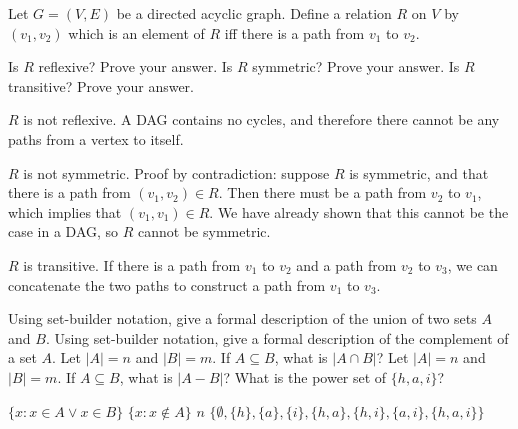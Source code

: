 \documentclass[solution, letterpaper]{cs20exam}
\begin{document}
\problem{}{}
Let $G = (V, E)$ be a directed acyclic graph. Define a relation $R$ on $V$ by $(v_1, v_2)$ which is an element of $R$ iff there is a path from $v_1$ to $v_2$.

\subproblem Is $R$ reflexive? Prove your answer.
\subproblem Is $R$ symmetric? Prove your answer.
\subproblem Is $R$ transitive? Prove your answer.

\begin{solution}

\subsolution $R$ is not reflexive. A DAG contains no cycles, and therefore there cannot be any paths from a vertex to itself.

\subsolution $R$ is not symmetric. Proof by contradiction: suppose $R$ is symmetric, and that there is a path from $(v_1, v_2) \in R$. Then there must be a path from $v_2$ to $v_1$, which implies that $(v_1, v_1) \in R$. We have already shown that this cannot be the case in a DAG, so $R$ cannot be symmetric.

\subsolution $R$ is transitive. If there is a path from $v_1$ to $v_2$ and a path from $v_2$ to $v_3$, we can concatenate the two paths to construct a path from $v_1$ to $v_3$.

\end{solution}


\pagebreak


\problem{}{}

\subproblem Using set-builder notation, give a formal description of the union of two sets $A$ and $B$. %
\subproblem Using set-builder notation, give a formal description of the complement of a set $A$. %
\subproblem Let $|A| = n$ and $|B| = m$. If $A \subseteq B$, what is $|A \cap B|$? %
\subproblem Let $|A| = n$ and $|B| = m$. If $A \subseteq B$, what is $|A - B|$? %
\subproblem What is the power set of $\{ h, a, i\}$? %

\begin{solution}
\subsolution $\{x : x \in A \vee x \in B\}$
\subsolution $\{x : x \notin A\}$
\subsolution $n$
\subsolution $\{\emptyset, \{h\}, \{a\}, \{i\}, \{h, a\}, \{h, i\}, \{a, i\}, \{h, a, i\} \}$
\end{solution}


\problem{}{}
\end{document}
